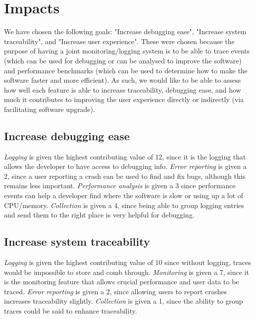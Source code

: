 \documentclass[paper=letter, fontsize=12pt]{scrartcl} %
\numberwithin{equation}{section} %
\numberwithin{figure}{section} %
\numberwithin{table}{section} %
\begin{document}
\newpage
\section{Impacts}
\hspace*{.5cm} We have chosen the following goals: "Increase debugging ease", "Increase system traceability", and "Increase user experience". These were chosen because the purpose of having a joint monitoring/logging system is to be able to trace events (which can be used for debugging or can be analysed to improve the software) and performance benchmarks (which can be used to determine how to make the software faster and more efficient). As such, we would like to be able to assess how well each feature is able to increase traceability, debugging ease, and how much it contributes to improving the user experience directly or indirectly (via facilitating software upgrade).

\subsection{Increase debugging ease}
\hspace*{.5cm} \textit{Logging} is given the highest contributing value of 12, since it is the logging that allows the developer to have access to debugging info. \textit{Error reporting} is given a 2, since a user reporting a crash can be used to find and fix bugs, although this remains less important. \textit{Performance analysis} is given a 3 since performance events can help a developer find where the software is slow or using up a lot of CPU/memory. \textit{Collection} is given a 4, since being able to group logging entries and send them to the right place is very helpful for debugging.

\subsection{Increase system traceability}
\hspace*{.5cm} \textit{Logging} is given the highest contributing value of 10 since without logging, traces would be impossible to store and comb through. \textit{Monitoring} is given a 7, since it is the monitoring feature that allows crucial performance and user data to be traced. \textit{Error reporting} is given a 2, since allowing users to report crashes increases traceability slightly. \textit{Collection} is given a 1, since the ability to group traces could be said to enhance traceability.
\end{document}
